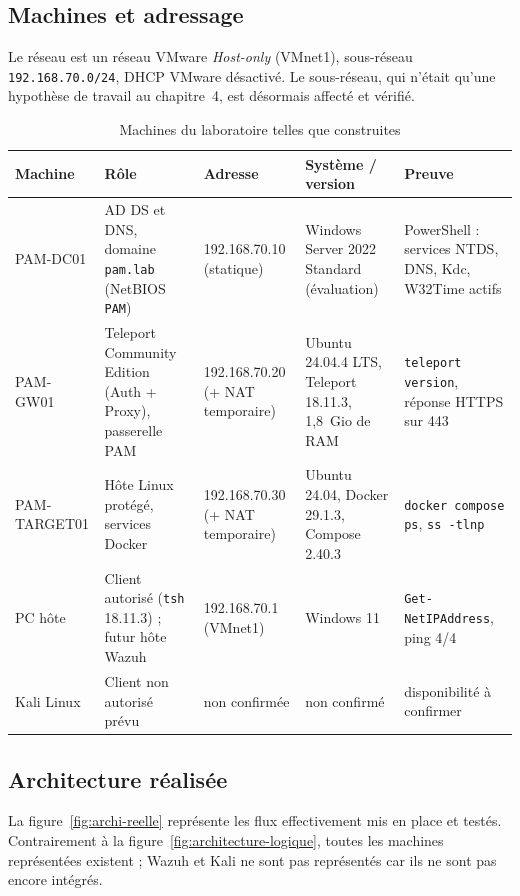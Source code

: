 \documentclass[11pt,a4paper]{report}
\begin{document}
\subsection{Machines et adressage}
Le réseau est un réseau VMware \emph{Host-only} (VMnet1), sous-réseau \texttt{192.168.70.0/24}, DHCP VMware désactivé. Le sous-réseau, qui n'était qu'une hypothèse de travail au chapitre~4, est désormais affecté et vérifié.

\footnotesize\setlength{\tabcolsep}{3pt}
\begin{longtable}{@{}p{2.1cm}p{3.5cm}p{2.5cm}p{3.7cm}p{3.1cm}@{}}
\caption{Machines du laboratoire telles que construites}\\
\toprule\textbf{Machine} & \textbf{Rôle} & \textbf{Adresse} & \textbf{Système / version} & \textbf{Preuve}\\ \midrule\endhead
PAM-DC01 & AD DS et DNS, domaine \texttt{pam.lab} (NetBIOS \texttt{PAM}) & 192.168.70.10 (statique) & Windows Server 2022 Standard (évaluation) & PowerShell : services NTDS, DNS, Kdc, W32Time actifs\\
PAM-GW01 & Teleport Community Edition (Auth + Proxy), passerelle PAM & 192.168.70.20 (+ NAT temporaire) & Ubuntu 24.04.4 LTS, Teleport 18.11.3, 1,8~Gio de RAM & \texttt{teleport version}, réponse HTTPS sur 443\\
PAM-TARGET01 & Hôte Linux protégé, services Docker & 192.168.70.30 (+ NAT temporaire) & Ubuntu 24.04, Docker 29.1.3, Compose 2.40.3 & \texttt{docker compose ps}, \texttt{ss -tlnp}\\
PC hôte & Client autorisé (\texttt{tsh} 18.11.3) ; futur hôte Wazuh & 192.168.70.1 (VMnet1) & Windows 11 & \texttt{Get-NetIPAddress}, ping 4/4\\
Kali Linux & Client non autorisé prévu & non confirmée & non confirmé & disponibilité à confirmer\\
\bottomrule
\end{longtable}
\normalsize

\subsection{Architecture réalisée}
La figure~\ref{fig:archi-reelle} représente les flux effectivement mis en place et testés. Contrairement à la figure~\ref{fig:architecture-logique}, toutes les machines représentées existent ; Wazuh et Kali ne sont pas représentés car ils ne sont pas encore intégrés.
\end{document}
